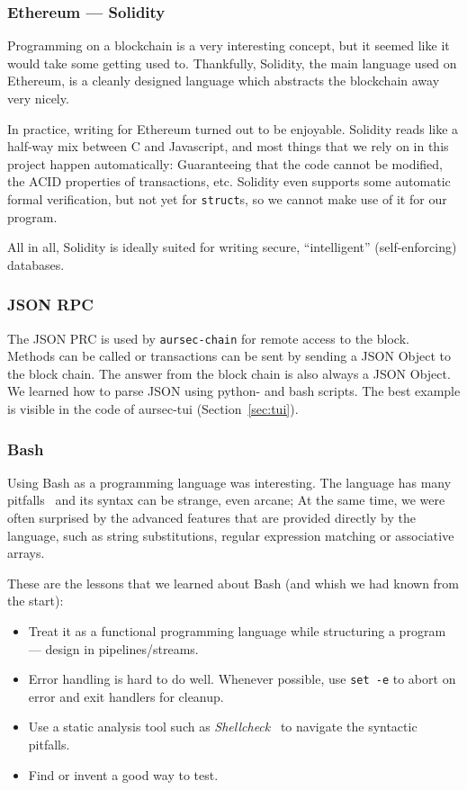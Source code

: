 
\subsubsection*{Ethereum --- Solidity}
Programming on a blockchain is a very interesting concept, but it seemed like it would take some getting used to. Thankfully, Solidity, the main language used on Ethereum, is a cleanly designed language which abstracts the blockchain away very nicely.

In practice, writing for Ethereum turned out to be enjoyable. Solidity reads like a half-way mix between C and Javascript, and most things that we rely on in this project happen automatically: Guaranteeing that the code cannot be modified, the ACID properties of transactions, etc. Solidity even supports some automatic formal verification, but not yet for \texttt{struct}s, so we cannot make use of it for our program.

All in all, Solidity is ideally suited for writing secure, \enquote{intelligent} (self-enforcing) databases.

\subsubsection*{JSON RPC}
The JSON PRC is used by \texttt{aursec-chain} for remote access to the block. Methods can be called or transactions can be sent by sending a JSON Object to the block chain. The answer from the block chain is also always a JSON Object. We learned how to parse JSON using python- and bash scripts. The best example is visible in the code of aursec-tui (Section~\ref{sec:tui}).

\subsubsection*{Bash}
Using Bash as a programming language was interesting. The language has many pitfalls~\cite{bash:pitfalls} and its syntax can be strange, even arcane; At the same time, we were often surprised by the advanced features that are provided directly by the language, such as string substitutions, regular expression matching or associative arrays.

These are the lessons that we learned about Bash (and whish we had known from the start):

\begin{itemize}
	\item Treat it as a functional programming language while structuring a program --- design in pipelines/streams.
	\item Error handling is hard to do well.
	Whenever possible, use \texttt{set -e} to abort on error and exit handlers for cleanup.
	\item Use a static analysis tool such as \emph{Shellcheck}~\cite{bash:shellcheck} to navigate the syntactic pitfalls.
	\item Find or invent a good way to test.
\end{itemize}

